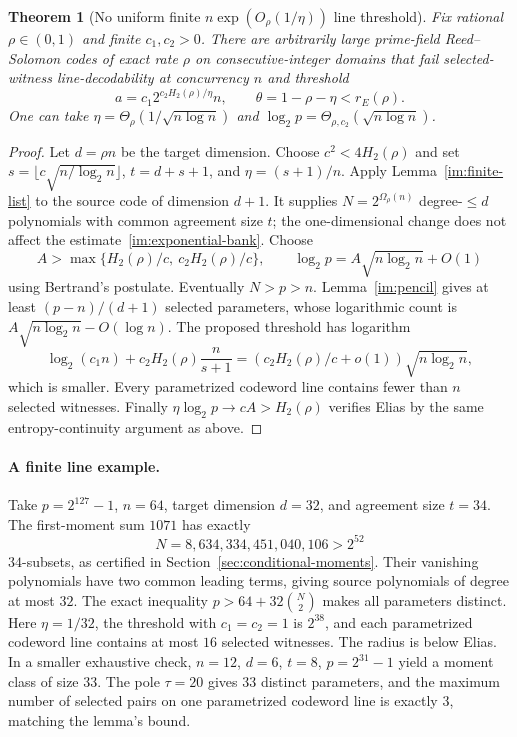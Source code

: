 \documentclass[11pt,letterpaper]{article}
\newtheorem{theorem}{Theorem}[section]
\theoremstyle{definition}
\theoremstyle{remark}
\begin{document}
\begin{theorem}[No uniform finite $n\exp(O_\rho(1/\eta))$ line threshold]
\label{im:all-lines}
Fix rational $\rho\in(0,1)$ and finite $c_1,c_2>0$. There are arbitrarily
large prime-field Reed--Solomon codes of exact rate $\rho$ on
consecutive-integer domains that fail selected-witness line-decodability
at concurrency $n$ and threshold
\[
 a=c_1 2^{c_2H_2(\rho)/\eta}n,
 \qquad\theta=1-\rho-\eta<r_E(\rho).
\]
One can take $\eta=\Theta_\rho(1/\sqrt{n\log n})$ and
$\log_2p=\Theta_{\rho,c_2}(\sqrt{n\log n})$.
\end{theorem}
\begin{proof}
Let $d=\rho n$ be the target dimension. Choose $c^2<4H_2(\rho)$ and set
$s=\lfloor c\sqrt{n/\log_2n}\rfloor$, $t=d+s+1$, and $\eta=(s+1)/n$.
Apply Lemma~\ref{im:finite-list} to the source code of dimension $d+1$.
It supplies $N=2^{\Omega_\rho(n)}$ degree-$\le d$ polynomials with common
agreement size $t$; the one-dimensional change does not affect the
estimate~\eqref{im:exponential-bank}.
Choose
\[
 A>\max\{H_2(\rho)/c,\ c_2H_2(\rho)/c\},\qquad
 \log_2p=A\sqrt{n\log_2n}+O(1)
\]
using Bertrand's postulate. Eventually $N>p>n$. Lemma~\ref{im:pencil}
gives at least $(p-n)/(d+1)$ selected parameters, whose logarithmic count
is $A\sqrt{n\log_2n}-O(\log n)$. The proposed threshold has logarithm
\[
 \log_2(c_1n)+c_2H_2(\rho)\frac n{s+1}
 =\left(c_2H_2(\rho)/c+o(1)\right)\sqrt{n\log_2n},
\]
which is smaller. Every parametrized codeword line contains fewer than
$n$ selected witnesses. Finally $\eta\log_2p\to cA>H_2(\rho)$
verifies Elias by the same entropy-continuity argument as above.
\end{proof}

\paragraph{A finite line example.}
Take $p=2^{127}-1$, $n=64$, target dimension $d=32$, and agreement size
$t=34$. The first-moment sum $1071$ has exactly
\[
 N=8{,}634{,}334{,}451{,}040{,}106>2^{52}
\]
$34$-subsets, as certified in Section~\ref{sec:conditional-moments}.
Their vanishing polynomials have two common leading terms, giving source
polynomials of degree at most $32$. The exact inequality
$p>64+32\binom N2$ makes all parameters distinct. Here $\eta=1/32$,
the threshold with $c_1=c_2=1$ is $2^{38}$, and each parametrized codeword
line contains at most $16$ selected witnesses. The radius is below Elias.
In a smaller exhaustive check, $n=12$, $d=6$, $t=8$, $p=2^{31}-1$ yield
a moment class of size $33$. The pole $\tau=20$ gives $33$ distinct
parameters, and the maximum number of selected pairs on one parametrized
codeword line is exactly $3$, matching the lemma's bound.
\end{document}
